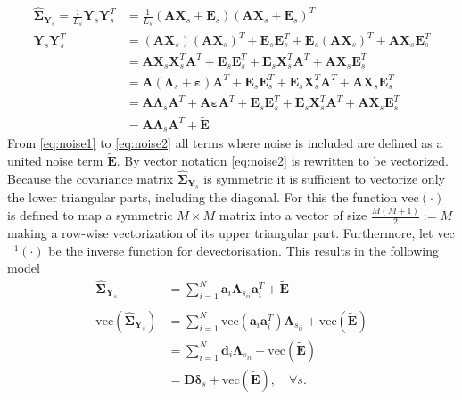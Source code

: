 \begin{align} 
\widehat{\boldsymbol{\Sigma}}_{\mathbf{Y}_s} = \frac{1}{L_s}\mathbf{Y}_s \mathbf{Y}_s^T &= \frac{1}{L_s} \left( \mathbf{A} \mathbf{X}_s + \mathbf{E}_s \right) \left( \mathbf{A} \mathbf{X}_s + \mathbf{E}_s\right)^T \nonumber \\ 
\mathbf{Y}_s \mathbf{Y}_s^T &= (\textbf{AX}_s)(\textbf{AX}_s)^T + \textbf{E}_s \textbf{E}_s^T + \textbf{E}_s (\textbf{AX}_s)^T + \textbf{AX}_s \textbf{E}_s^T \nonumber \\
&= \textbf{AX}_s \textbf{X}_s^T \textbf{A}^T + \textbf{E}_s \textbf{E}_s^T + \textbf{E}_s \textbf{X}_s^T \textbf{A}^T + \textbf{AX}_s \textbf{E}_s^T \nonumber \\
&= \textbf{A}(\boldsymbol{\Lambda}_s +\boldsymbol{\varepsilon}) \textbf{A}^T + \textbf{E}_s \textbf{E}_s^T + \textbf{E}_s \textbf{X}_s^T \textbf{A}^T + \textbf{AX}_s \textbf{E}_s^T \nonumber \\
&= \textbf{A} \boldsymbol{\Lambda}_s \textbf{A}^T + \textbf{A} \boldsymbol{\varepsilon} \textbf{A}^T + \textbf{E}_s \textbf{E}_s^T + \textbf{E}_s \textbf{X}_s^T \textbf{A}^T + \textbf{AX}_s \textbf{E}_s^T \label{eq:noise1} \\
&= \textbf{A} \boldsymbol{\Lambda}_s \textbf{A}^T + \widetilde{\textbf{E}} \label{eq:noise2}
\end{align}
From \eqref{eq:noise1} to \eqref{eq:noise2} all terms where noise is included are defined as a united noise term $\widetilde{\textbf{E}}$. 
By vector notation \eqref{eq:noise2} is rewritten to be vectorized. 
Because the covariance matrix $\widehat{\boldsymbol{\Sigma}}_{\mathbf{Y}_s}$ is symmetric it is sufficient to vectorize only the lower triangular parts, including the diagonal. 
For this the function $\text{vec}(\cdot)$ is defined to map a symmetric $M \times M$ matrix into a vector of size $\frac{M(M+1)}{2} := \widetilde{M}$ making a row-wise vectorization of its upper triangular part. 
Furthermore, let vec$^{-1}(\cdot)$ be the inverse function for devectorisation. 
This results in the following model        
\begin{align}
\widehat{\boldsymbol{\Sigma}}_{\mathbf{Y}_s} &= \sum_{i=1}^{N}  \textbf{a}_i \boldsymbol{\Lambda}_{s_{ii}} \textbf{a}_i^{T} + \widetilde{\textbf{E}} \nonumber \\
& \nonumber \\
\text{vec}(\widehat{\boldsymbol{\Sigma}}_{\mathbf{Y}_s}) &= \sum_{i=1}^N \text{vec}(\mathbf{a}_i \mathbf{a}_i^T) \boldsymbol{\Lambda}_{s_{ii}} + \text{vec}( \widetilde{\textbf{E}}) \nonumber \\
&= \sum_{i=1}^N \mathbf{d}_i \boldsymbol{\Lambda}_{s_{ii}} + \text{vec}( \widetilde{\textbf{E}}) \nonumber \nonumber \\
&= \mathbf{D} \boldsymbol{\delta}_s + \text{vec}( \widetilde{\textbf{E}}), \quad \forall s. \label{eq:cov1}
\end{align}

